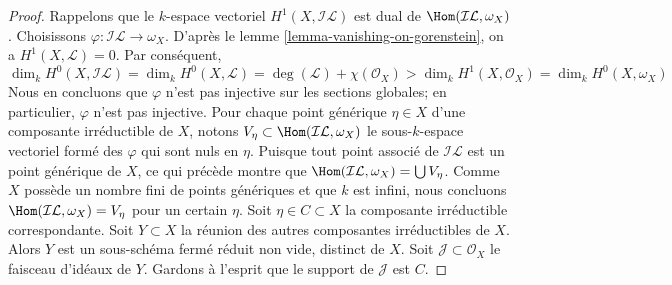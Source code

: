 \begin{proof}
\medskip\noindent
Rappelons que le $k$-espace vectoriel $H^1(X, \mathcal{I}\mathcal{L})$ est dual de $\Hom(\mathcal{I}\mathcal{L}, \omega_X)$. Choisissons $\varphi : \mathcal{I}\mathcal{L} \to \omega_X$. D'après le lemme \ref{lemma-vanishing-on-gorenstein}, on a $H^1(X, \mathcal{L}) = 0$. Par conséquent, $$
\dim_k H^0(X, \mathcal{I}\mathcal{L}) = \dim_k H^0(X, \mathcal{L}) =
\deg(\mathcal{L}) + \chi(\mathcal{O}_X) > \dim_k H^1(X, \mathcal{O}_X) =
\dim_k H^0(X, \omega_X)
$$ Nous en concluons que $\varphi$ n'est pas injective sur les sections globales; en particulier, $\varphi$ n'est pas injective. Pour chaque point générique $\eta \in X$ d'une composante irréductible de $X$, notons $V_\eta \subset \Hom(\mathcal{I}\mathcal{L}, \omega_X)$ le sous-$k$-espace vectoriel formé des $\varphi$ qui sont nuls en $\eta$. Puisque tout point associé de $\mathcal{I}\mathcal{L}$ est un point générique de $X$, ce qui précède montre que $\Hom(\mathcal{I}\mathcal{L}, \omega_X) = \bigcup V_\eta$. Comme $X$ possède un nombre fini de points génériques et que $k$ est infini, nous concluons $\Hom(\mathcal{I}\mathcal{L}, \omega_X) = V_\eta$ pour un certain $\eta$. Soit $\eta \in C \subset X$ la composante irréductible correspondante. Soit $Y \subset X$ la réunion des autres composantes irréductibles de $X$. Alors $Y$ est un sous-schéma fermé réduit non vide, distinct de $X$. Soit $\mathcal{J} \subset \mathcal{O}_X$ le faisceau d'idéaux de $Y$. Gardons à l'esprit que le support de $\mathcal{J}$ est $C$.


\end{proof}
